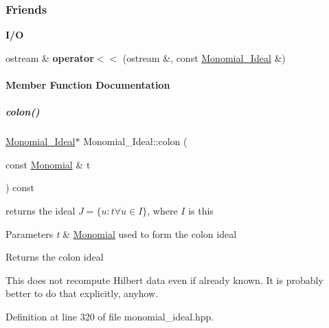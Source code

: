 \subsubsection*{Friends}
\begin{Indent}\textbf{ I/O}\par
\begin{DoxyCompactItemize}
\item 
\mbox{\label{group__polygroup_afcb33f97b01be14e0eefe468fe752b7b}} 
ostream \& {\bfseries operator$<$$<$} (ostream \&, const \hyperlink{group__polygroup_class_monomial___ideal}{Monomial\+\_\+\+Ideal} \&)
\end{DoxyCompactItemize}
\end{Indent}


\paragraph{Member Function Documentation}
\mbox{\label{group__polygroup_a708f7bc64b3e5d5ac3ea8e3b0cb15769}} 
\subparagraph{\texorpdfstring{colon()}{colon()}}
{\footnotesize\ttfamily \hyperlink{group__polygroup_class_monomial___ideal}{Monomial\+\_\+\+Ideal}$\ast$ Monomial\+\_\+\+Ideal\+::colon (\begin{DoxyParamCaption}\item[{const \hyperlink{group__polygroup_class_monomial}{Monomial} \&}]{t }\end{DoxyParamCaption}) const\hspace{0.3cm}{\ttfamily [inline]}}



returns the ideal $J=\{u:t \forall u\in I\}$, where $I$ is {\ttfamily this} 


\begin{DoxyParams}{Parameters}
{\em t} & \hyperlink{group__polygroup_class_monomial}{Monomial} used to form the colon ideal \\
\hline
\end{DoxyParams}
\begin{DoxyReturn}{Returns}
the colon ideal
\end{DoxyReturn}
This does not recompute Hilbert data even if already known. It is probably better to do that explicitly, anyhow. 

Definition at line 320 of file monomial\+\_\+ideal.\+hpp.

